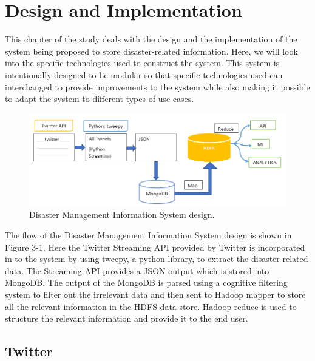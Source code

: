 \chapter{Design and Implementation}

This chapter of the study deals with the design and the implementation of the system being proposed to store disaster-related information. Here, we will look into the specific technologies used to construct the system. This system is intentionally designed to be modular so that specific technologies used can interchanged to provide improvements to the system while also making it possible to adapt the system to different types of use cases.

\begin{figure}[ht!]
	\centering
	\includegraphics[width=150mm]{DesignDiagram.png}
	\caption{Disaster Management Information System design. \label{overflow}}
\end{figure}

The flow of the Disaster Management Information System design is shown in Figure 3-1. Here the Twitter Streaming API provided by Twitter is incorporated in to the system by using tweepy, a python library, to extract the disaster related data. The Streaming API provides a JSON output which is stored into MongoDB. The output of the MongoDB is parsed using a cognitive filtering system to filter out the irrelevant data and then sent to Hadoop mapper to store all the relevant information in the HDFS data store. Hadoop reduce is used to structure the relevant information and provide it to the end user.

\section{Twitter}

